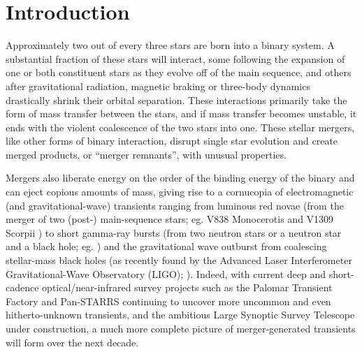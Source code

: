 \chapter{Introduction}


Approximately two out of every three stars are born into a binary system.  A substantial fraction of these stars will interact, some following the expansion of one or both constituent stars as they evolve off of the main sequence, and others after gravitational radiation, magnetic braking or three-body dynamics drastically shrink their orbital separation.  These interactions primarily take the form of mass transfer between the stars, and if mass transfer becomes unstable, it ends with the violent coalescence of the two stars into one.  These stellar mergers, like other forms of binary interaction, disrupt single star evolution and create merged products, or ``merger remnants'', with unusual properties.

Mergers also liberate energy on the order of the binding energy of the binary and can eject copious amounts of mass, giving rise to a cornucopia of electromagnetic (and gravitational-wave) transients ranging from luminous red novae (from the merger of two (post-) main-sequence stars; eg. V838 Monocerotis and V1309 Scorpii \citep{tyle+11, nandil14}) to short gamma-ray bursts (from two neutron stars or a neutron star and a black hole; eg. \citealt{ross15}) and the gravitational wave outburst from coalescing stellar-mass black holes (as recently found by the Advanced Laser Interferometer Gravitational-Wave Observatory (LIGO); \citealt{ligo16}).  Indeed, with current deep and short-cadence optical/near-infrared survey projects such as the Palomar Transient Factory \citep{rau+09} and Pan-STARRS \citep{kais+10} continuing to uncover more uncommon and even hitherto-unknown transients, and the ambitious Large Synoptic Survey Telescope \citep{lsst09} under construction, a much more complete picture of merger-generated transients will form over the next decade.

